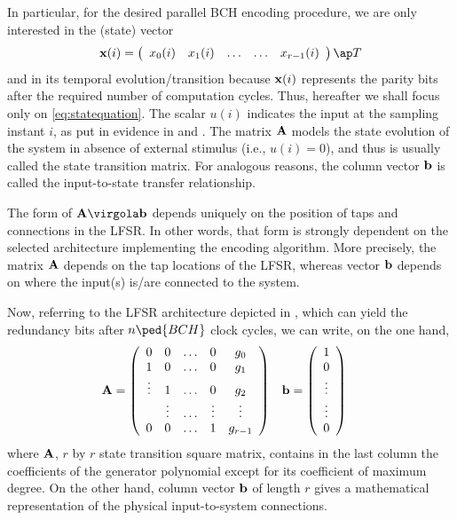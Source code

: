 In particular, for the desired parallel BCH encoding procedure, we are only interested in the (state) vector
\begin{equation}
\vet x(i) =
\left(
\begin{array}{ccccc}
  x_0(i)   & x_1(i) & \ldots  & \ldots & x_{r-1}(i) \\
\end{array}
\right)\ap T
\end{equation}
and in its temporal evolution/transition because \(\mathbf{x}(i)\) represents the parity bits after the required number of computation cycles. Thus, hereafter we shall focus only on \eqref{eq:statequation}. The scalar $u(i)$ indicates the input at the sampling instant $i$, as put in evidence in  and . The matrix \(\mathbf{A}\) models the state evolution of the system in absence of external stimulus (i.e., \(u(i)=0\)), and thus is usually called the state transition matrix. For analogous reasons, the column vector $\mathbf{b}$ is called the input-to-state transfer relationship. %

The form of \(\vet A \virgola \vet b\) depends uniquely on the position of taps and connections in the LFSR. In other words, that form is strongly dependent on the selected architecture implementing the encoding algorithm. More precisely, the matrix $\mathbf{A}$ depends on the tap locations of the LFSR, whereas vector $\mathbf{b}$ depends on where the input(s) is/are connected to the system.

Now, referring to the LFSR architecture depicted in , which can yield the redundancy bits after $n\ped{BCH}$ clock cycles, we can write, on the one hand,
\begin{align}
\mathbf{A} & = \left (
\begin{array} {ccccc}
0      &  0     & \ldots &  0     & g_0\\
1      &  0     & \ldots & 0      & g_1\\
\vdots &  1     & \ldots &   0    & g_2\\
       & \vdots & \ldots & \vdots & \vdots\\
0      & 0      & \ldots & 1      & g_{r-1} \\
\end{array} \right ) &
\mathbf{b} & = \left(
\begin{array}{c}
  1 \\
  0 \\
   \vdots \\
    \vdots \\
    0\\
\end{array} \right) \label{eq:ParSyst}
\end{align}
where $\mathbf{A}$, $r$ by $r$ state transition square matrix, contains in the last column the coefficients of the generator polynomial except for its coefficient of maximum degree. On the other hand, column vector $\mathbf{b}$ of length $r$ gives a mathematical representation of the physical input-to-system connections.

